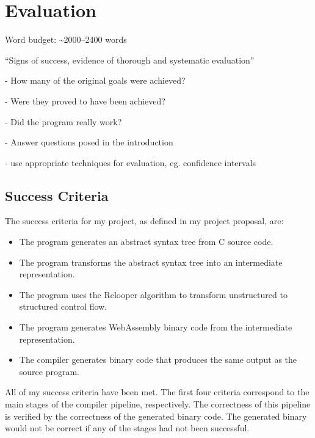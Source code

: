 \documentclass[00-main.tex]{subfiles}
\begin{document}
\chapter{Evaluation}

\newcommand{\IncludeStackPlot}[1]{\resizebox{0.98\textwidth}{!}{}}

\begin{Comment}
Word budget: \textasciitilde 2000--2400 words
\end{Comment}

\begin{Comment}
``Signs of success, evidence of thorough and systematic evaluation''

- How many of the original goals were achieved?

- Were they proved to have been achieved?

- Did the program really work?

- Answer questions posed in the introduction

- use appropriate techniques for evaluation, eg. confidence intervals
\end{Comment}


\section{Success Criteria}

The success criteria for my project, as defined in my project proposal, are:
\begin{itemize}
\item The program generates an abstract syntax tree from C source code.
\item The program transforms the abstract syntax tree into an intermediate representation.
\item The program uses the Relooper algorithm to transform unstructured to structured control
flow.
\item The program generates WebAssembly binary code from the intermediate representation.
\item The compiler generates binary code that produces the same output as the source program.
\end{itemize}

All of my success criteria have been met.
The first four criteria correspond to the main stages of the compiler pipeline, respectively.
The correctness of this pipeline is verified by the correctness of the generated binary code.
The generated binary would not be correct if any of the stages had not been successful.
\end{document}
